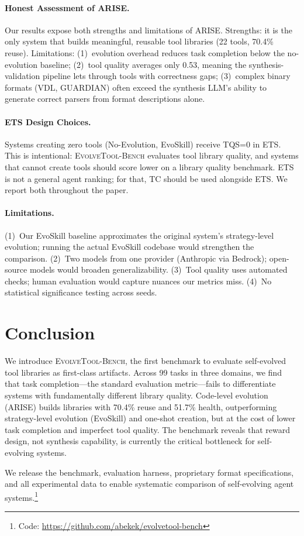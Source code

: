 \documentclass[10pt,twocolumn]{article}
\begin{document}
\paragraph{Honest Assessment of ARISE.} Our results expose both strengths and limitations of ARISE. Strengths: it is the only system that builds meaningful, reusable tool libraries (22 tools, 70.4\% reuse). Limitations: (1)~evolution overhead reduces task completion below the no-evolution baseline; (2)~tool quality averages only 0.53, meaning the synthesis-validation pipeline lets through tools with correctness gaps; (3)~complex binary formats (VDL, GUARDIAN) often exceed the synthesis LLM's ability to generate correct parsers from format descriptions alone.

\paragraph{ETS Design Choices.} Systems creating zero tools (No-Evolution, EvoSkill) receive TQS=0 in ETS. This is intentional: \textsc{EvolveTool-Bench} evaluates tool library quality, and systems that cannot create tools should score lower on a library quality benchmark. ETS is not a general agent ranking; for that, TC should be used alongside ETS. We report both throughout the paper.

\paragraph{Limitations.} (1)~Our EvoSkill baseline approximates the original system's strategy-level evolution; running the actual EvoSkill codebase would strengthen the comparison. (2)~Two models from one provider (Anthropic via Bedrock); open-source models would broaden generalizability. (3)~Tool quality uses automated checks; human evaluation would capture nuances our metrics miss. (4)~No statistical significance testing across seeds.

\section{Conclusion}

We introduce \textsc{EvolveTool-Bench}, the first benchmark to evaluate self-evolved tool libraries as first-class artifacts. Across 99 tasks in three domains, we find that task completion---the standard evaluation metric---fails to differentiate systems with fundamentally different library quality. Code-level evolution (ARISE) builds libraries with 70.4\% reuse and 51.7\% health, outperforming strategy-level evolution (EvoSkill) and one-shot creation, but at the cost of lower task completion and imperfect tool quality. The benchmark reveals that reward design, not synthesis capability, is currently the critical bottleneck for self-evolving systems.

We release the benchmark, evaluation harness, proprietary format specifications, and all experimental data to enable systematic comparison of self-evolving agent systems.\footnote{Code: \url{https://github.com/abekek/evolvetool-bench}}



\end{document}
